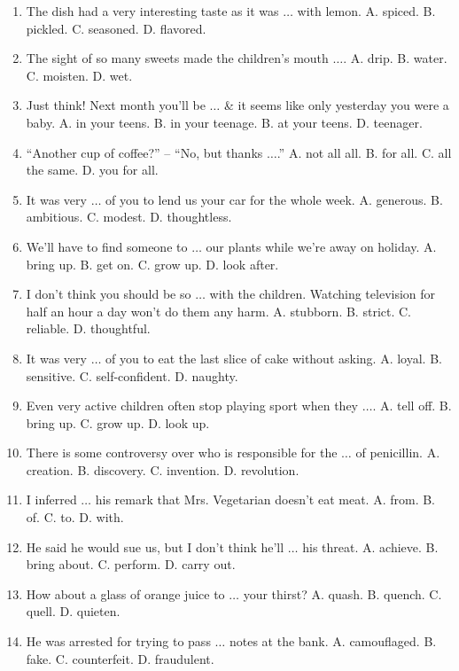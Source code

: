 \documentclass{article}
\numberwithin{equation}{section}
\begin{document}
\begin{enumerate}[leftmargin=2mm]
	\item The dish had a very interesting taste as it was $\ldots$ with lemon. {\sf A.} spiced. {\sf B.} pickled. {\sf C.} seasoned. {\sf D.} flavored.
	\item The sight of so many sweets made the children's mouth $\ldots$. {\sf A.} drip. {\sf B.} water. {\sf C.} moisten. {\sf D.} wet.
	\item Just think! Next month you'll be $\ldots$ \& it seems like only yesterday you were a baby. {\sf A.} in your teens. {\sf B.} in your teenage. {\sf B.} at your teens. {\sf D.} teenager.
	\item ``Another cup of coffee?'' -- ``No, but thanks $\ldots$.'' {\sf A.} not all all. {\sf B.} for all. {\sf C.} all the same. {\sf D.} you for all.
	\item It was very $\ldots$ of you to lend us your car for the whole week. {\sf A.} generous. {\sf B.} ambitious. {\sf C.} modest. {\sf D.} thoughtless.
	\item We'll have to find someone to $\ldots$ our plants while we're away on holiday. {\sf A.} bring up. {\sf B.} get on. {\sf C.} grow up. {\sf D.} look after.
	\item I don't think you should be so $\ldots$ with the children. Watching television for half an hour a day won't do them any harm. {\sf A.} stubborn. {\sf B.} strict. {\sf C.} reliable. {\sf D.} thoughtful.
	\item It was very $\ldots$ of you to eat the last slice of cake without asking. {\sf A.} loyal. {\sf B.} sensitive. {\sf C.} self-confident. {\sf D.} naughty.
	\item Even very active children often stop playing sport when they $\ldots$. {\sf A.} tell off. {\sf B.} bring up. {\sf C.} grow up. {\sf D.} look up.
	\item There is some controversy over who is responsible for the $\ldots$ of penicillin. {\sf A.} creation. {\sf B.} discovery. {\sf C.} invention. {\sf D.} revolution.
	\item I inferred $\ldots$ his remark that Mrs. Vegetarian doesn't eat meat. {\sf A.} from. {\sf B.} of. {\sf C.} to. {\sf D.} with.
	\item He said he would sue us, but I don't think he'll $\ldots$ his threat. {\sf A.} achieve. {\sf B.} bring about. {\sf C.} perform. {\sf D.} carry out.
	\item How about a glass of orange juice to $\ldots$ your thirst? {\sf A.} quash. {\sf B.} quench. {\sf C.} quell. {\sf D.} quieten.
	\item He was arrested for trying to pass $\ldots$ notes at the bank. {\sf A.} camouflaged. {\sf B.} fake. {\sf C.} counterfeit. {\sf D.} fraudulent.

\end{enumerate}
\end{document}
